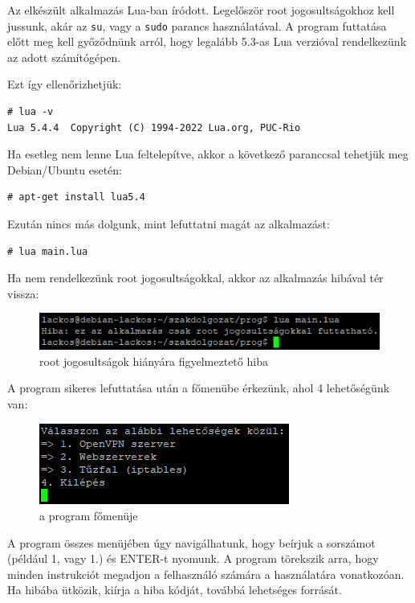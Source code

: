 
Az elkészült alkalmazás Lua-ban íródott. Legelőször root jogosultságokhoz kell jussunk, akár az \texttt{su}, vagy a \texttt{sudo} parancs használatával. A program futtatása előtt meg kell győződnünk arról, hogy legalább 5.3-as Lua verzióval rendelkezünk az adott számítógépen. 

Ezt így ellenőrizhetjük:
\begin{verbatim}
# lua -v
Lua 5.4.4  Copyright (C) 1994-2022 Lua.org, PUC-Rio
\end{verbatim}

Ha esetleg nem lenne Lua feltelepítve, akkor a következő paranccsal tehetjük meg Debian/Ubuntu esetén:

\begin{verbatim}
# apt-get install lua5.4
\end{verbatim}

Ezután nincs más dolgunk, mint lefuttatni magát az alkalmazást:

\begin{verbatim}
# lua main.lua
\end{verbatim}

Ha nem rendelkezünk root jogosultságokkal, akkor az alkalmazás hibával tér vissza:

\begin{figure}[h]
\centering
\includegraphics[scale=1]{images/root_required.png}
\caption{root jogosultságok hiányára figyelmeztető hiba}
\end{figure}

A program sikeres lefuttatása után a főmenübe érkezünk, ahol 4 lehetőségünk van:

\begin{figure}[h]
\centering
\includegraphics[scale=1]{images/main_menu.png}
\caption{a program főmenüje}
\end{figure}

A program összes menüjében úgy navigálhatunk, hogy beírjuk a sorszámot (például 1, vagy 1.) és ENTER-t nyomunk. A program törekszik arra, hogy minden instrukciót megadjon a felhasználó számára a használatára vonatkozóan. Ha hibába ütközik, kiírja a hiba kódját, továbbá lehetséges forrását.

